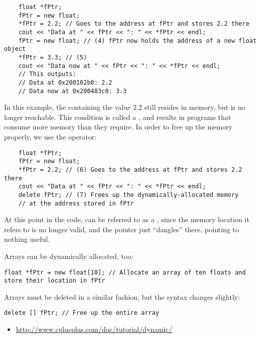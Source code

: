 
\begin{lstlisting}
	float *fPtr;
	fPtr = new float;
	*fPtr = 2.2; // Goes to the address at fPtr and stores 2.2 there
	cout << "Data at " << fPtr << ": " << *fPtr << endl;
	fPtr = new float; // (4) fPtr now holds the address of a new float object
	*fPtr = 3.3; // (5)
	cout << "Data now at " << fPtr << ": " << *fPtr << endl;
	// This outputs: 
	// Data at 0x200102b0: 2.2
	// Data now at 0x200483c0: 3.3
\end{lstlisting}

In this example, the  containing the value $2.2$ still resides in memory, but is no longer reachable. 
This condition is called a , and results in programs that consume more memory than they require. 
In order to free up the memory properly, we use the  operator:

\begin{lstlisting}
	float *fPtr;
	fPtr = new float;
	*fPtr = 2.2; // (6) Goes to the address at fPtr and stores 2.2 there
	cout << "Data at " << fPtr << ": " << *fPtr << endl;
	delete fPtr; // (7) Frees up the dynamically-allocated memory 
	// at the address stored in fPtr
\end{lstlisting}

At this point in the code,  can be referred to as a , since the memory location it refers to is no longer valid, and the pointer just ``dangles'' there, pointing to nothing useful. 


Arrays can be dynamically allocated, too:

\begin{lstlisting}
float *fPtr = new float[10]; // Allocate an array of ten floats and store their location in fPtr
\end{lstlisting}

Arrays must be deleted in a similar fashion, but the syntax changes slightly:

\begin{lstlisting}
delete [] fPtr; // Free up the entire array
\end{lstlisting}







\begin{itemize}
\item \url{http://www.cplusplus.com/doc/tutorial/dynamic/}
\end{itemize}	

